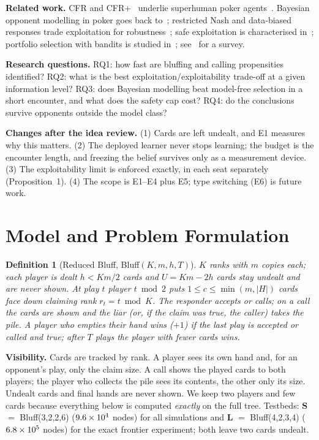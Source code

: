 \documentclass[11pt]{article}
\newtheorem{definition}{Definition}
\begin{document}
\textbf{Related work.} CFR and CFR+~\cite{zinkevich2007,lanctot2009,neller2013} underlie superhuman poker agents~\cite{brown2018,brown2019}. Bayesian opponent modelling in poker goes back to~\cite{southey2005}; restricted Nash and data-biased responses trade exploitation for robustness~\cite{johanson2007,johanson2009}; safe exploitation is characterised in~\cite{ganzfried2015}; portfolio selection with bandits is studied in~\cite{bard2013,auer2002ucb,auer2002exp3}; see~\cite{albrecht2018} for a survey.

\textbf{Research questions.} RQ1: how fast are bluffing and calling propensities identified? RQ2: what is the best exploitation/exploitability trade-off at a given information level? RQ3: does Bayesian modelling beat model-free selection in a short encounter, and what does the safety cap cost? RQ4: do the conclusions survive opponents outside the model class?

\textbf{Changes after the idea review.} (1) Cards are left undealt, and E1 measures why this matters. (2) The deployed learner never stops learning; the budget is the encounter length, and freezing the belief survives only as a measurement device. (3) The exploitability limit is enforced exactly, in each seat separately (Proposition~1). (4) The scope is E1--E4 plus E5; type switching (E6) is future work.

\section{Model and Problem Formulation}
\begin{definition}[Reduced Bluff, Bluff$(K,m,h,T)$]
$K$ ranks with $m$ copies each; each player is dealt $h<Km/2$ cards and $U=Km-2h$ cards stay undealt and are never shown. At play $t$ player $t\bmod2$ puts $1\le c\le\min(m,|H|)$ cards face down claiming rank $r_t=t\bmod K$. The responder accepts or calls; on a call the cards are shown and the liar (or, if the claim was true, the caller) takes the pile. A player who empties their hand wins ($+1$) if the last play is accepted or called and true; after $T$ plays the player with fewer cards wins.
\end{definition}
\textbf{Visibility.} Cards are tracked by rank. A player sees its own hand and, for an opponent's play, only the claim size. A call shows the played cards to both players; the player who collects the pile sees its contents, the other only its size. Undealt cards and final hands are never shown. We keep two players and few cards because everything below is computed \emph{exactly} on the full tree. Testbeds: \textbf{S} $=$ Bluff(3,2,2,6) ($9.6\times10^4$ nodes) for all simulations and \textbf{L} $=$ Bluff(4,2,3,4) ($6.8\times10^5$ nodes) for the exact frontier experiment; both leave two cards undealt.
\end{document}
